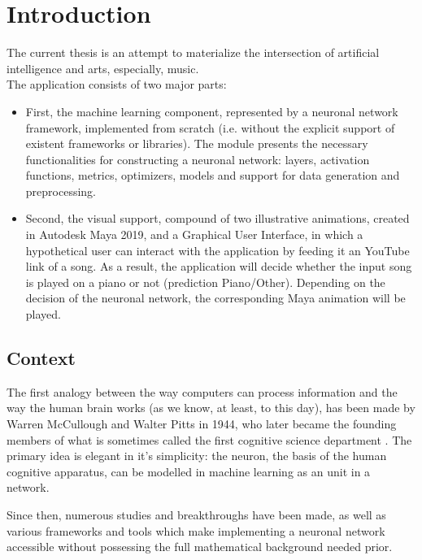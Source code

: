 \chapter*{Introduction}

The current thesis is an attempt to materialize the intersection of artificial intelligence and arts, especially, music. \\

The application consists of two major parts:\\
	\begin{itemize}
		\item  First, the machine learning component, represented by a neuronal network framework, implemented from scratch (i.e. without the explicit support of existent frameworks or libraries). The module presents the necessary functionalities for constructing a neuronal network: layers, activation functions, metrics, optimizers, models and support for data generation and preprocessing.\\

		\item Second, the visual support, compound of two illustrative animations, created in Autodesk Maya 2019, and a Graphical User Interface, in which a hypothetical user can interact with the application by feeding it an YouTube link of a song. As a result, the application will decide whether the input song is played on a piano or not (prediction Piano/Other). Depending on the decision of the neuronal network, the corresponding Maya animation will be played.\\
	\end{itemize}

	\section{Context}

	The first analogy between the way computers can process information and the way the human brain works (as we know, at least, to this day), has been made by Warren McCullough and Walter Pitts in 1944, who later became the founding members of what is sometimes called the first cognitive science department \cite{mitnn}. The primary idea is elegant in it's simplicity: the neuron, the basis of the human cognitive apparatus, can be modelled in machine learning as an unit in a network.

	Since then, numerous studies and breakthroughs have been made, as well as various frameworks and tools which make implementing a neuronal network accessible without possessing the full mathematical background needed prior.

